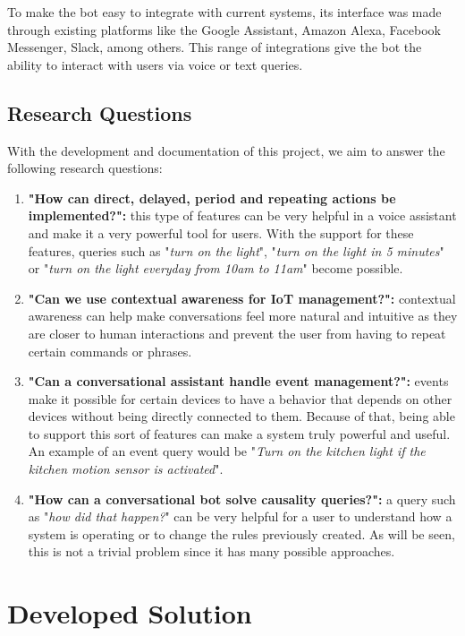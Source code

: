\documentclass[runningheads]{llncs}
\begin{document}
To make the bot easy to integrate with current systems, its interface was made through existing platforms like the Google Assistant, Amazon Alexa, Facebook Messenger, Slack, among others. This range of integrations give the bot the ability to interact with users via voice or text queries.

\subsection{Research Questions}

With the development and documentation of this project, we aim to answer the following research questions:

\begin{enumerate}
    \item \textbf{"How can direct, delayed, period and repeating actions be implemented?":} this type of features can be very helpful in a voice assistant and make it a very powerful tool for users. With the support for these features, queries such as "\textit{turn on the light}", "\textit{turn on the light in 5 minutes}" or "\textit{turn on the light everyday from 10am to 11am}" become possible.

    \item \textbf{"Can we use contextual awareness for IoT management?":} contextual awareness can help make conversations feel more natural and intuitive as they are closer to human interactions and prevent the user from having to repeat certain commands or phrases. 
    
    \item \textbf{"Can a conversational assistant handle event management?":} events make it possible for certain devices to have a behavior that depends on other devices without being directly connected to them. Because of that, being able to support this sort of features can make a system truly powerful and useful. An example of an event query would be "\textit{Turn on the kitchen light if the kitchen motion sensor is activated}".
    
    \item \textbf{"How can a conversational bot solve causality queries?":} a query such as "\textit{how did that happen?}" can be very helpful for a user to understand how a system is operating or to change the rules previously created. As will be seen, this is not a trivial problem since it has many possible approaches.
\end{enumerate}

\section{Developed Solution}
\end{document}
